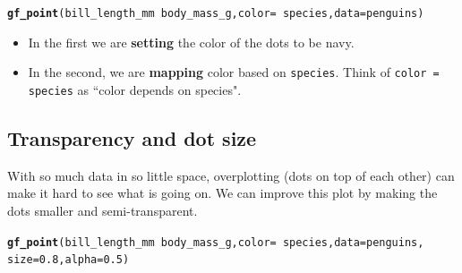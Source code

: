 \documentclass[twoside]{book}\usepackage[]{graphicx}\usepackage[]{xcolor}
\makeatletter
\newcommand{\hlnum}[1]{\textcolor[rgb]{0.686,0.059,0.569}{#1}}%
\newcommand{\hlopt}[1]{\textcolor[rgb]{0,0,0}{#1}}%
\newcommand{\hlstd}[1]{\textcolor[rgb]{0.345,0.345,0.345}{#1}}%
\newcommand{\hlkwc}[1]{\textcolor[rgb]{0.333,0.667,0.333}{#1}}%
\newcommand{\hlkwd}[1]{\textcolor[rgb]{0.737,0.353,0.396}{\textbf{#1}}}%
\newenvironment{kframe}{%
 \def\at@end@of@kframe{}%
 \ifinner\ifhmode%
  \def\at@end@of@kframe{\end{minipage}}%
  \begin{minipage}{\columnwidth}%
 \fi\fi%
 \def\FrameCommand##1{\hskip\@totalleftmargin \hskip-\fboxsep
 \colorbox{shadecolor}{##1}\hskip-\fboxsep
     \hskip-\linewidth \hskip-\@totalleftmargin \hskip\columnwidth}%
 \MakeFramed {\advance\hsize-\width
   \@totalleftmargin\z@ \linewidth\hsize
   \@setminipage}}%
 {\par\unskip\endMakeFramed%
 \at@end@of@kframe}
\newenvironment{knitrout}{}{} %
\renewcommand{\code}[1]{{\color{blue!80!black}\texttt{#1}}}
\def\term#1{\textbf{#1}}
\makeatother
\begin{document}
\begin{knitrout}
\color{fgcolor}\begin{kframe}
\begin{alltt}
\hlkwd{gf_point}\hlstd{(bill_length_mm} \hlopt{~} \hlstd{body_mass_g,} \hlkwc{color} \hlstd{=} \hlopt{~} \hlstd{species,} \hlkwc{data} \hlstd{= penguins)}
\end{alltt}


{\ttfamily\noindent\bfseries\color{errorcolor}{\#\# Error in gf\_ingredients(formula = gformula, data = data, gg\_object = object, : object 'penguins' not found}}\end{kframe}
\end{knitrout}

\begin{itemize}
\item
In the first we are \term{setting} the color of the dots to be navy.
\item
In the second, we are \term{mapping} color based on \code{species}.
Think of \code{color = ~ species} as ``color depends on  species".
\end{itemize}

\subsection{Transparency and dot size}

With so much data in so little space, overplotting (dots on top of each other) can make 
it hard to see what is going on. We can improve this plot by making the dots smaller
and semi-transparent.

\begin{knitrout}
\color{fgcolor}\begin{kframe}
\begin{alltt}
\hlkwd{gf_point}\hlstd{(bill_length_mm} \hlopt{~} \hlstd{body_mass_g,} \hlkwc{color} \hlstd{=} \hlopt{~} \hlstd{species,} \hlkwc{data} \hlstd{= penguins,}
         \hlkwc{size} \hlstd{=} \hlnum{0.8}\hlstd{,} \hlkwc{alpha} \hlstd{=} \hlnum{0.5}\hlstd{)}
\end{alltt}


{\ttfamily\noindent\bfseries\color{errorcolor}{\#\# Error in gf\_ingredients(formula = gformula, data = data, gg\_object = object, : object 'penguins' not found}}\end{kframe}
\end{knitrout}
\end{document}
